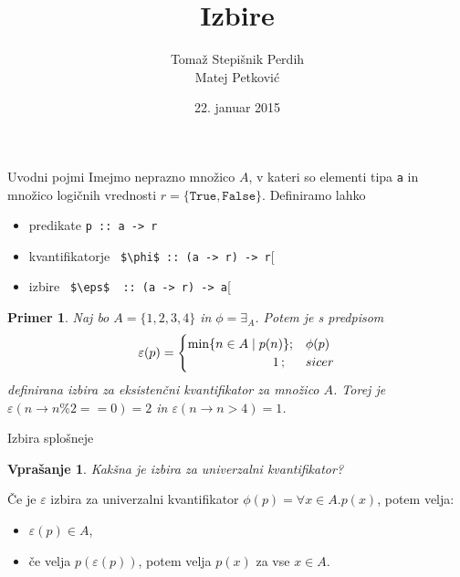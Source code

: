 \documentclass{beamer}
\author[Sintaktična sladkorčka]{Tomaž Stepišnik Perdih\\  Matej Petković}
\title{Izbire}
\date{{22. januar 2015}}
\newtheorem{dok}{Vprašanje}
\newtheorem{prim}{Primer}
\def\eps{\varepsilon}
\begin{document}
\begin{frame}
\titlepage 
\end{frame}

\begin{frame}{Uvodni pojmi}
Imejmo neprazno množico $A$, v kateri so elementi tipa \texttt{a}  in množico logičnih vrednosti $r =  \{ \texttt{True}, \texttt{False}\} $. Definiramo lahko
\begin{itemize}
\item predikate\; \lstinline!p :: a -> r!
\item kvantifikatorje\; \lstinline[mathescape]! $\phi$ :: (a -> r) -> r![
\item izbire\; \lstinline[mathescape]! $\eps$  :: (a -> r) -> a![
\end{itemize}

\pause

\begin{prim}
Naj bo $A = \{1,2,3,4\}$ in $\phi = \exists_A$. Potem je s predpisom
$$\eps (p) =
\begin{cases}
\min \{ n \in A \mid p(n) \} ;& \phi(p)\\
\hphantom{oooooooooioooo}1\, ;& sicer
\end{cases}
$$
definirana izbira za eksistenčni kvantifikator za množico $A$. Torej je $\eps (n \to n\%2 == 0) = 2$ in $\eps (n \to n > 4) = 1$.
\end{prim}

\end{frame}

\begin{frame}[fragile]{Izbira splošneje}%

\begin{dok}
Kakšna je izbira za univerzalni kvantifikator?
\end{dok}

\pause

Če je $\eps$ izbira za univerzalni kvantifikator $\phi(p) = \forall x \in A . p(x)$, potem velja:
\begin{itemize}
\item $\eps(p) \in A$,
\item če velja $p(\eps(p))$, potem velja $p(x)$ za vse $x \in A$.
\end{itemize}


\end{frame}
\end{document}
